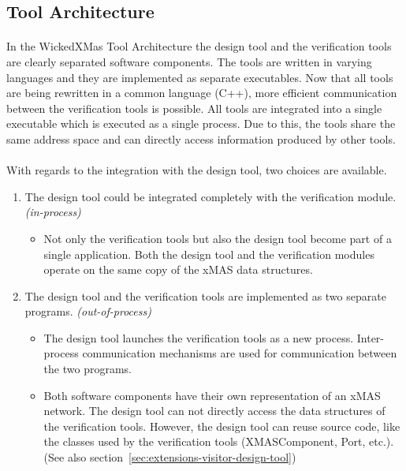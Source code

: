 \documentclass[a4paper,11pt]{article}
\begin{document}
\subsection{Tool Architecture}
\label{sec:tool-architecture}

\paragraph{}
In the WickedXMas Tool Architecture the design tool and the verification tools
are clearly separated software components. The tools are written in varying languages
and they are implemented as separate executables. Now that all tools are being rewritten
in a common language (C++), more efficient communication between the verification tools
is possible. All tools are integrated into a single executable which is executed as a
single process. Due to this, the tools share the same address space and can directly
access information produced by other tools.\\

\paragraph{}
With regards to the integration with the design tool, two choices are available.
\begin{enumerate}
 \item The design tool could be integrated completely with the verification module.
 \emph{(in-process)}
 \begin{itemize}
  \item Not only the verification tools but also the design tool become part of a single
  application. Both the design tool and the verification modules operate on the same
  copy of the xMAS data structures.
 \end{itemize}

 \item The design tool and the verification tools are implemented as two separate
 programs. \emph{(out-of-process)}
 \begin{itemize}
  \item The design tool launches the verification tools as a new process. Inter-process
  communication mechanisms are used for communication between the two programs.
  \item Both software components have their own representation of an xMAS network. The
  design tool can not directly access the data structures of the verification tools.
  However, the design tool can reuse source code, like the classes used by the verification
  tools (XMASComponent, Port, etc.). (See also section~\ref{sec:extensions-visitor-design-tool})
 \end{itemize}
 
\end{enumerate}
\end{document}
